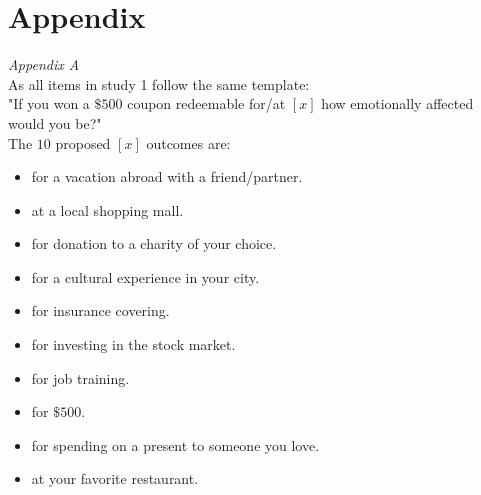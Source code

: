 \documentclass[12pt]{article}
\begin{document}
\section{Appendix}

\emph{Appendix A} \\
As all items in study 1 follow the same template: \\

"If you won a $\$500$ coupon redeemable for/at
$[x]$ how emotionally affected would you be?" \\

The $10$ proposed $[x]$ outcomes are:
\begin{itemize}
	\item for a vacation abroad with a friend/partner.
	\item at a local shopping mall.
	\item for donation to a charity of your choice.
	\item for a cultural experience in your city.
	\item for insurance covering.
	\item for investing in the stock market.
	\item for job training.
	\item for $\$500$.
	\item for spending on a present to someone you love.
	\item at your favorite restaurant.
\end{itemize}
\end{document}
